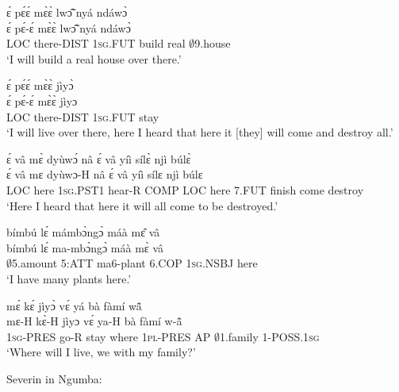 \begin{exe} 
\exC\label{60} 
  \glll  ɛ́ pɛ́ɛ́ mɛ̀ɛ̀ lwɔ̃̂ nyá ndáwɔ̀ \\
         ɛ́ pɛ́-ɛ́ mɛ̀ɛ̀ lwɔ̃̂ nyá ndáwɔ̀ \\
          LOC there-DIST 1\textsc{sg}.FUT build real $\emptyset$9.house \\
    \trans `I will build a real house over there.'
\end{exe}

\begin{exe} 
\exC\label{61}
  \glll  ɛ́ pɛ́ɛ́ mɛ̀ɛ̀ jìyɔ̀ \\
         ɛ́ pɛ́-ɛ́ mɛ̀ɛ̀ jìyɔ \\
          LOC there-DIST 1\textsc{sg}.FUT stay \\
    \trans `I will live over there, here I heard that here it [they] will come and destroy all.'
\end{exe}

\begin{exe} 
\exC\label{62}
  \glll  ɛ́ vâ mɛ̀ dyùwɔ́ nâ ɛ́ vâ yíì sílɛ̀ njì búlɛ̀\\
        ɛ́ vâ mɛ dyùwɔ-H nâ ɛ́ vâ yíì sílɛ njì búlɛ\\
         LOC here 1\textsc{sg}.PST1 hear-R COMP LOC here 7.FUT finish come destroy\\
    \trans `Here I heard that here it will all come to be destroyed.'
\end{exe}

\begin{exe} 
\exC\label{63}
  \glll  bímbú lɛ́ mámbɔ̀ngɔ̀ máà mɛ̂ vâ \\
        bímbú lɛ́ ma-mbɔ̀ngɔ̀ máà mɛ̀ vâ \\
           $\emptyset$5.amount 5:ATT ma6-plant 6.COP 1\textsc{sg}.NSBJ here  \\
    \trans `I have many plants here.'
\end{exe}

\begin{exe} 
\exC\label{64}
  \glll  mɛ́ kɛ́ jìyɔ̀ vɛ́ yá bà fàmí wã̂ \\
          mɛ-H kɛ̀-H jìyɔ vɛ́ ya-H bà fàmí w-ã̂ \\
            1\textsc{sg}-PRES go-R stay where 1\textsc{pl}-PRES AP $\emptyset$1.family 1-POSS.1\textsc{sg} \\
    \trans `Where will I live, we with my family?'
\end{exe}

\noindent Severin in Ngumba:

